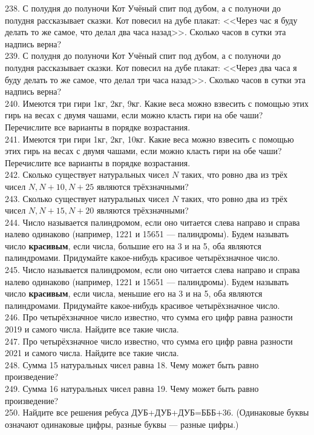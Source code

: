 \documentclass[12pt]{article}
\begin{document}
238. С полудня до полуночи Кот Учёный спит под дубом, а с полуночи до полудня рассказывает сказки. Кот повесил на дубе плакат: <<Через час я буду делать то же самое, что делал два часа назад>>. Сколько часов в сутки эта надпись верна?\\
239. С полудня до полуночи Кот Учёный спит под дубом, а с полуночи до полудня рассказывает сказки. Кот повесил на дубе плакат: <<Через два часа я буду делать то же самое, что делал три часа назад>>. Сколько часов в сутки эта надпись верна?\\
240. Имеются три гири 1кг, 2кг, 9кг. Какие веса можно взвесить с помощью этих гирь на весах с двумя чашами, если можно класть гири на обе чаши? Перечислите все варианты в порядке возрастания.\\
241. Имеются три гири 1кг, 2кг, 10кг. Какие веса можно взвесить с помощью этих гирь на весах с двумя чашами, если можно класть гири на обе чаши? Перечислите все варианты в порядке возрастания.\\
242. Сколько существует натуральных чисел $N$ таких, что ровно два из трёх чисел $N, N+10, N+25$ являются трёхзначными?\\
243. Сколько существует натуральных чисел $N$ таких, что ровно два из трёх чисел $N, N+15, N+20$ являются трёхзначными?\\
244. Число называется палиндромом, если оно читается слева направо и справа налево одинаково (например, 1221 и 15651 --- палиндромы). Будем называть число {\bf красивым}, если числа, большие его на 3 и на 5, оба являются палиндромами. Придумайте какое-нибудь красивое четырёхзначное число.\\
245. Число называется палиндромом, если оно читается слева направо и справа налево одинаково (например, 1221 и 15651 --- палиндромы). Будем называть число {\bf красивым}, если числа, меньшие его на 3 и на 5, оба являются палиндромами. Придумайте какое-нибудь красивое четырёхзначное число.\\
246. Про четырёхзначное число известно, что сумма его цифр равна разности 2019 и самого числа. Найдите все такие числа.\\
247. Про четырёхзначное число известно, что сумма его цифр равна разности 2021 и самого числа. Найдите все такие числа.\\
248. Сумма 15 натуральных чисел равна 18. Чему может быть равно произведение?\\
249. Сумма 16 натуральных чисел равна 19. Чему может быть равно произведение?\\
250. Найдите все решения ребуса ДУБ+ДУБ+ДУБ=БББ+36. (Одинаковые буквы означают одинаковые цифры, разные буквы --- разные цифры.)\\
\end{document}
